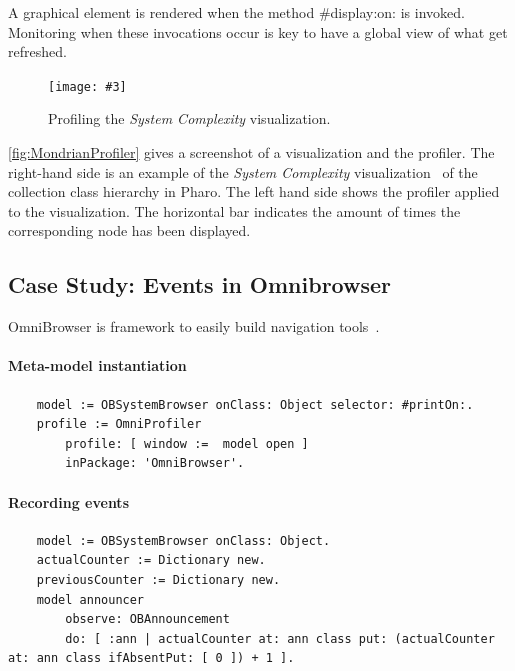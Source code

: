 \documentclass[runningheads]{llncs}
\newcommand{\project}{{\sc MetaSpy}\xspace}
\newcommand{\ct}{\lstinline[backgroundcolor=\color{white},basicstyle=\footnotesize\ttfamily]}
\newcommand{\fig}[4]{
	\begin{figure}[#1]
		\centering
		\texttt{[image: \#3]}
		\caption{\label{fig:#3}#4}
	\end{figure}}
\begin{document}
A graphical element is rendered when the method {\sf \#display:on:} is invoked. Monitoring when these invocations occur is key to have a global view of what get refreshed. 
%
%
%
\fig{}{.8}{MondrianProfiler}{Profiling the \emph{System Complexity} visualization.}

\autoref{fig:MondrianProfiler} gives a screenshot of a visualization and the profiler. The right-hand side is an example of the \emph{System Complexity} visualization~\cite{Lanz03d} of the collection class hierarchy in Pharo. The left hand side shows the profiler applied to the visualization. The horizontal bar indicates the amount of times the corresponding node has been displayed. %


\subsection{Case Study: Events in Omnibrowser}

OmniBrowser is framework to easily build navigation tools~\cite{Berg08c}. 

\paragraph{Meta-model instantiation}
\begin{lstlisting}
	model := OBSystemBrowser onClass: Object selector: #printOn:.
	profile := OmniProfiler 
		profile: [ window :=  model open ]
		inPackage: 'OmniBrowser'.
\end{lstlisting}

\paragraph{Recording events}
\begin{lstlisting}
	model := OBSystemBrowser onClass: Object.
	actualCounter := Dictionary new.
	previousCounter := Dictionary new.
	model announcer
		observe: OBAnnouncement
		do: [ :ann | actualCounter at: ann class put: (actualCounter at: ann class ifAbsentPut: [ 0 ]) + 1 ].
\end{lstlisting}
\end{document}
